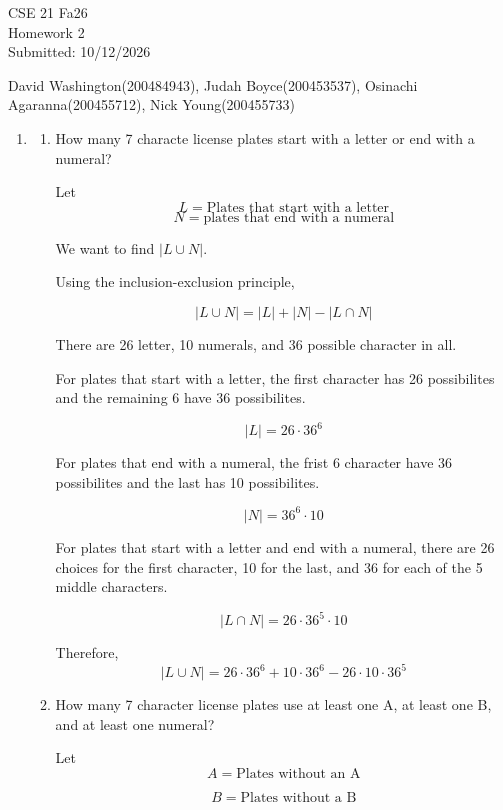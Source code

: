 \documentclass{article}
\begin{document}
\begin{flushright}
CSE 21 Fa26\\
Homework 2\\
Submitted: 10/12/2026
\end{flushright}

\begin{center}
David Washington(200484943), Judah Boyce(200453537), Osinachi Agaranna(200455712), Nick Young(200455733)
\end{center}

\begin{enumerate}

\item
\begin{enumerate}

\item How many 7 characte license plates start with a letter or end with a numeral?

Let
\[
L = \text{Plates that start with a letter}
\]
\[
N = \text{plates that end with a numeral}
\]

We want to find $|L \cup N|$.

Using the inclusion-exclusion principle, 

\[
|L \cup N| = |L| + |N| - |L \cap N|
\]

There are 26 letter, 10 numerals, and 36 possible character in all.

For plates that start with a letter, the first character has 26 possibilites and the remaining 6 have 36 possibilites.

\[
|L| = 26 \cdot 36^6
\]

For plates that end with a numeral, the frist 6 character have 36 possibilites and the last has 10 possibilites.

\[
|N| = 36^6 \cdot 10
\]

For plates that start with a letter and end with a numeral, there are 26 choices for the first character, 10 for the last, and 36 for each of the 5 middle characters.

\[
|L \cap N| = 26 \cdot 36^5 \cdot 10
\]

Therefore,
\[
\boxed{
|L \cup N|
=
26 \cdot 36^6
+ 
10 \cdot 36^6
-
26 \cdot 10 \cdot 36^5
}
\]

\item How many 7 character license plates use at least one A, at least one B, and at least one numeral?

Let
\[
A = \text{Plates without an A}
\]

\[
B = \text {Plates without a B}
\]


\end{enumerate}
\end{enumerate}
\end{document}
